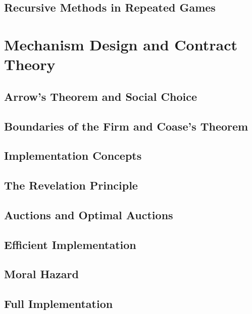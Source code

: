 \documentclass[12pt,openany]{report}
\theoremstyle{indented}
\numberwithin{definition}{section}
\numberwithin{theorem}{section}
\numberwithin{example}{section}
\begin{document}
\chapter{Recursive Methods in Repeated Games}

\part{Mechanism Design and Contract Theory}

\chapter{Arrow's Theorem and Social Choice}

\chapter{Boundaries of the Firm and Coase's Theorem}

\chapter{Implementation Concepts}

\chapter{The Revelation Principle}

\chapter{Auctions and Optimal Auctions}

\chapter{Efficient Implementation}

\chapter{Moral Hazard}

\chapter{Full Implementation}

\newpage


\end{document}
